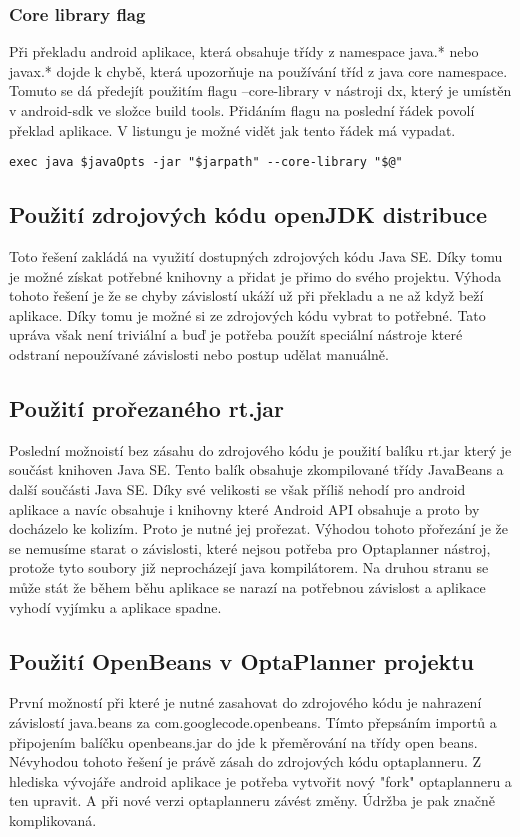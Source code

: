 \subsubsection{Core library flag}
Při překladu android aplikace, která obsahuje třídy z namespace java.* nebo javax.* dojde k chybě, která upozorňuje na používání tříd z java core namespace. Tomuto se dá předejít použitím flagu --core-library v nástroji dx, který je umístěn v android-sdk ve složce build tools. Přidáním flagu na poslední řádek povolí překlad aplikace. V listungu je možné vidět jak tento řádek má vypadat.
\\
\begin{lstlisting}[captionpos={b},caption={Spanning tree broadcast algorithm.},frame={lines},label={command},basicstyle=\footnotesize]
exec java $javaOpts -jar "$jarpath" --core-library "$@"
\end{lstlisting}

\subsection{Použití zdrojových kódu openJDK distribuce}
Toto řešení zakládá na využití dostupných zdrojových kódu Java SE. Díky tomu je možné získat potřebné knihovny a přidat je přimo do svého projektu. Výhoda tohoto řešení je že se chyby závislostí ukáží už při překladu a ne až když beží aplikace. Díky tomu je možné si ze zdrojových kódu vybrat to potřebné. Tato upráva však není triviální a buď je potřeba použít speciální nástroje které odstraní nepoužívané závislosti nebo postup udělat manuálně. 

\subsection{Použití prořezaného rt.jar}
Poslední možnoistí bez zásahu do zdrojového kódu je použití balíku rt.jar který je součást knihoven Java SE. Tento balík obsahuje zkompilované třídy JavaBeans a další součásti Java SE. Díky své velikosti se však příliš nehodí pro android aplikace a navíc obsahuje i knihovny které Android API obsahuje a proto by docházelo ke kolizím. Proto je nutné jej prořezat. Výhodou tohoto přořezání je že se nemusíme starat o závislosti, které nejsou potřeba pro Optaplanner nástroj, protože tyto soubory již neprocházejí java kompilátorem. Na druhou stranu se může stát že během běhu aplikace se narazí na potřebnou závislost a aplikace vyhodí vyjímku a aplikace spadne.

\subsection{Použití OpenBeans v OptaPlanner projektu}
První možností při které je nutné zasahovat do zdrojového kódu je nahrazení závislostí java.beans za com.googlecode.openbeans. Tímto přepsáním importů a připojením balíčku openbeans.jar do jde k přeměrování na třídy open beans. Névyhodou tohoto řešení je právě zásah do zdrojových kódu optaplanneru. Z hlediska vývojáře android aplikace je potřeba vytvořit nový "fork" optaplanneru a ten upravit. A při nové verzi optaplanneru závést změny. Údržba je pak značně komplikovaná.

